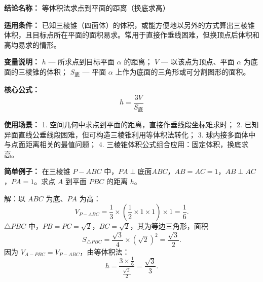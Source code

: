 \textbf{结论名称：} 等体积法求点到平面的距离（换底求高）

\textbf{适用条件：} 已知三棱锥（四面体）的体积，或能方便地以另外的方式算出三棱锥体积，且目标点所在平面的面积易求。常用于直接作垂线困难，但换顶点后体积和高均易求的情形。

\textbf{变量说明：}
$h$ — 所求点到目标平面 $\alpha$ 的距离；
$V$ — 以该点为顶点、平面 $\alpha$ 为底面的三棱锥的体积；
$S_{\text{底}}$ — 平面 $\alpha$ 上作为底面的三角形或可分割图形的面积。

\textbf{核心公式：}
\[
\boxed{h = \frac{3V}{S_{\text{底}}}}
\]

\textbf{使用场景：}
1. 空间几何中求点到平面的距离，直接作垂线段坐标难求时；
2. 已知异面直线公垂线段困难，但可构造三棱锥利用等体积法转化；
3. 球内接多面体中与点面距离相关的最值问题；
4. 三棱锥体积公式组合应用：固定体积，换底求高。

\textbf{简单例子：}
在三棱锥 $P-ABC$ 中，$PA\perp\text{底面}ABC$，$AB=AC=1$，$AB\perp AC$，$PA=1$。求点 $A$ 到平面 $PBC$ 的距离 $h$。

解：以 $ABC$ 为底、$PA$ 为高：
\[
V_{P-ABC} = \frac{1}{3}\times \left(\frac{1}{2}\times 1\times 1\right) \times 1 = \frac{1}{6}.
\]
$\triangle PBC$ 中，$PB=PC=\sqrt{2}$，$BC=\sqrt{2}$，其为等边三角形，面积
\[
S_{\triangle PBC} = \frac{\sqrt{3}}{4} \times (\sqrt{2})^2 = \frac{\sqrt{3}}{2}.
\]
因为 $V_{A-PBC}=V_{P-ABC}$，由等体积法：
\[
h = \frac{3\times \frac{1}{6}}{\frac{\sqrt{3}}{2}} = \frac{\sqrt{3}}{3}.
\]